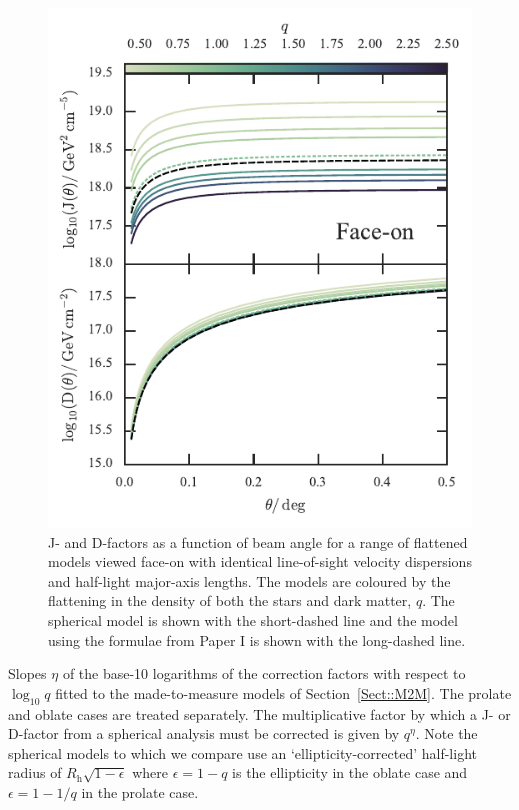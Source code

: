\documentclass[prd,twocolumn,showpacs,preprintnumbers,superscriptaddress,nofootinbib,amsmath,amssymb,nobalancelastpage]{revtex4}
\begin{document}
\begin{figure}
\includegraphics[width=\columnwidth]{J_profiles_sim_round}
\caption{J- and D-factors as a function of beam angle for a range of
  flattened models viewed face-on with identical line-of-sight
  velocity dispersions and half-light major-axis lengths. The models are
  coloured by the flattening in the density of both the stars and dark matter,
  $q$. The spherical model is shown with the short-dashed line and the
  model using the formulae from Paper I is shown with the long-dashed
  line.}
\label{fig:sim_profiles_round}
\end{figure}
%
\begin{table}
\caption{Slopes $\eta$ of the base-10 logarithms of the correction factors with respect to
  $\log_{10}q$ fitted to the made-to-measure models of
  Section~\ref{Sect::M2M}. The prolate and oblate cases are treated
  separately. The multiplicative factor by which a J- or D-factor from
  a spherical analysis must be corrected is given by $q^\eta$. Note the spherical models to which we compare use an `ellipticity-corrected' half-light radius of $R_\mathrm{h}\sqrt{1-\epsilon}$ where $\epsilon=1-q$ is the ellipticity in the oblate case and $\epsilon=1-1/q$ in the prolate case.}
\begin{centering}

\end{centering}
\label{table:fits}
\end{table}
\end{document}
